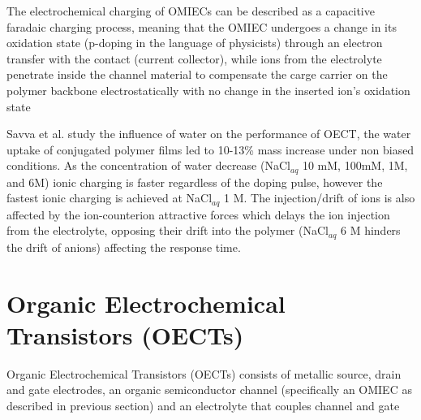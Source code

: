 The electrochemical charging of OMIECs can be described as a capacitive faradaic charging process,
meaning that the OMIEC undergoes a change in its oxidation state (p-doping in the language of physicists) through an electron transfer with the contact (current collector), while ions from the electrolyte penetrate inside the channel material to compensate the carge carrier on the polymer backbone electrostatically with no change in the inserted ion's oxidation state \cite{giovannittiEnergeticControlRedoxActive2020}  

Savva et al. study the influence of water on the performance of OECT, the water uptake of conjugated polymer films led to 10-13\% mass increase under non biased conditions. As the concentration of water decrease (NaCl$_{aq}$ 10 mM, 100mM, 1M, and 6M) ionic charging is faster regardless of the doping pulse, however the fastest ionic charging is achieved at NaCl$_{aq}$ 1 M. The injection/drift of ions is also affected by the ion-counterion attractive forces which delays the ion injection from the electrolyte, opposing their drift into the polymer (NaCl$_{aq}$ 6 M hinders the drift of anions) affecting the response time. \cite{savvaInfluenceWaterPerformance2019}

\section{Organic Electrochemical Transistors (OECTs)}

Organic Electrochemical Transistors (OECTs) consists of metallic source, drain and gate electrodes, an organic semiconductor channel (specifically an OMIEC as described in previous section) and an electrolyte that couples channel and gate \cite{rivnayOrganicElectrochemicalTransistors2018}

